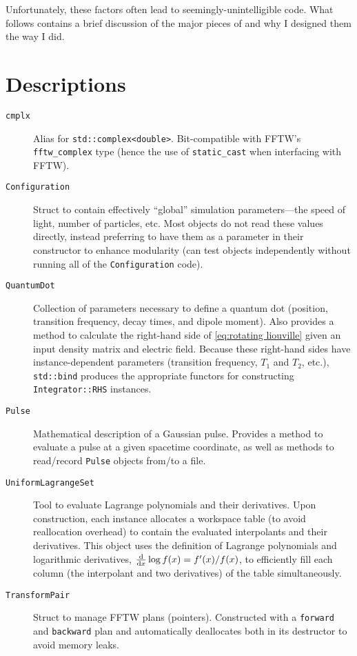 Unfortunately, these factors often lead to seemingly-unintelligible code. What follows contains a brief discussion of the major pieces of \QuEST{} and why I designed them the way I did.

\section{\label{sec:quest descriptions}Descriptions}

\begin{description}
  \item[\texttt{cmplx}] Alias for \lstinline!std::complex<double>!. Bit-compatible with FFTW's \lstinline!fftw_complex! type (hence the use of \lstinline!static_cast! when interfacing with FFTW).
  \item[\texttt{Configuration}] Struct to contain effectively ``global'' simulation parameters---the speed of light, number of particles, etc.
    Most objects do not read these values directly, instead preferring to have them as a parameter in their constructor to enhance modularity (can test objects independently without running all of the \lstinline!Configuration! code).
  \item[\texttt{QuantumDot}] Collection of parameters necessary to define a quantum dot (position, transition frequency, decay times, and dipole moment).
    Also provides a method to calculate the right-hand side of \cref{eq:rotating liouville} given an input density matrix and electric field.
    Because these right-hand sides have instance-dependent parameters (transition frequency, $T_1$ and $T_2$, etc.), \lstinline!std::bind! produces the appropriate functors for constructing \lstinline!Integrator::RHS! instances.
  \item[\texttt{Pulse}] Mathematical description of a Gaussian pulse.
    Provides a method to evaluate a pulse at a given spacetime coordinate, as well as methods to read/record \lstinline!Pulse! objects from/to a file.
  \item[\texttt{UniformLagrangeSet}] Tool to evaluate Lagrange polynomials and their derivatives.
    Upon construction, each instance allocates a workspace table (to avoid reallocation overhead) to contain the evaluated interpolants and their derivatives.
    This object uses the definition of Lagrange polynomials and logarithmic derivatives, $\dv{x} \log f(x) = f'(x)/f(x)$, to efficiently fill each column (the interpolant and two derivatives) of the table simultaneously.
  \item[\texttt{TransformPair}] Struct to manage FFTW plans (pointers). Constructed with a \lstinline!forward! and \lstinline!backward! plan and automatically deallocates both in its destructor to avoid memory leaks.

\end{description}
